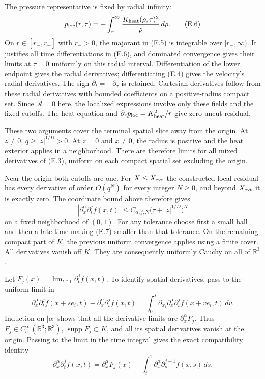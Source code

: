 \documentclass[10pt,a4paper]{article}
\begin{document}
The pressure representative is fixed by radial infinity:
\[
 p_{\rm loc}(r,\tau)=-\int_r^\infty
                 \frac{K_{\rm heat}(\rho,\tau)^2}{\rho}\,d\rho.
 \tag{E.6}
\]
On $r\in[r_-,r_+]$ with $r_->0$, the majorant in (E.5) is integrable
over $[r_-,\infty)$. It justifies all time differentiations in (E.6),
and dominated convergence gives their limits at $\tau=0$ uniformly
on this radial interval. Differentiation of the lower endpoint gives
the radial derivatives; differentiating (E.4) gives the velocity's
radial derivatives. The sign $\partial_t=-\partial_\tau$ is retained.
Cartesian derivatives follow from these radial derivatives with bounded
coefficients on a positive-radius compact set. Since $\mathcal A=0$
here, the localized expressions involve only these fields and the fixed
cutoffs. The heat equation and
$\partial_r p_{\rm loc}=K_{\rm heat}^2/r$ give zero uncut residual.

These two arguments cover the terminal spatial slice away from the
origin. At $z\ne0$, $q\ge |z|^{1/D}>0$. At $z=0$ and $x\ne0$,
the radius is positive and the heat exterior applies in a neighborhood.
There are therefore limits for all mixed derivatives of (E.3), uniform
on each compact spatial set excluding the origin.

Near the origin both cutoffs are one. For $X\le X_{\rm ext}$ the
constructed local residual has every derivative of order $O(q^N)$
for every integer $N\ge0$, and beyond $X_{\rm ext}$ it is exactly zero.
The coordinate bound above therefore gives
\[
 |\partial_x^\alpha\partial_t^jf(x,t)|
 \le C_{\alpha,j,N}\big(\tau+|z|^{1/D}\big)^N
 \tag{E.7}
\]
on a fixed neighborhood of $(0,1)$. For any tolerance choose first a
small ball and then a late time making (E.7) smaller than that tolerance.
On the remaining compact part of $K$, the previous uniform convergence
applies using a finite cover. All derivatives vanish off $K$.
They are consequently uniformly Cauchy on all of $\mathbb R^3$.

Let $F_j(x)=\lim_{t\uparrow1}\partial_t^jf(x,t)$. To identify spatial
derivatives, pass to the uniform limit in
\[
 \partial_x^\alpha\partial_t^jf(x+se_i,t)
 -\partial_x^\alpha\partial_t^jf(x,t)
 =\int_0^s\partial_{x_i}\partial_x^\alpha\partial_t^jf(x+ve_i,t)\,dv.
\]
Induction on $|\alpha|$ shows that all the derivative limits are
$\partial_x^\alpha F_j$. Thus $F_j\in C_c^\infty(\mathbb R^3;\mathbb R^3)$,
$\operatorname{supp}F_j\subset K$, and all its spatial derivatives
vanish at the origin. Passing to the limit in the time integral gives
the exact compatibility identity
\[
 \partial_x^\alpha\partial_t^jf(x,t)
 =\partial_x^\alpha F_j(x)
       -\int_t^1\partial_x^\alpha\partial_s^{j+1}f(x,s)\,ds.
 \tag{E.8}
\]
\end{document}
